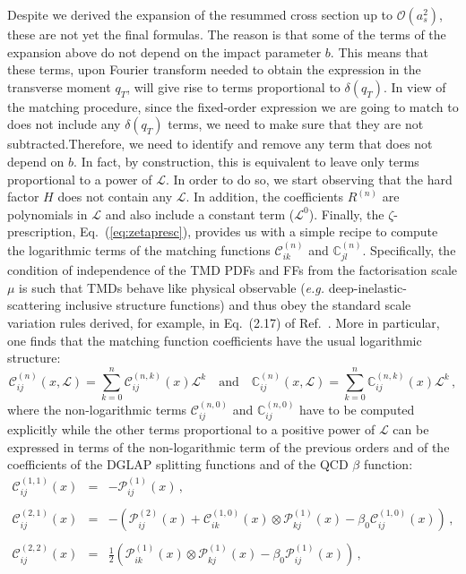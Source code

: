 \documentclass[10pt,a4paper]{article}
\begin{document}
Despite we derived the expansion of the resummed cross section up to
$\mathcal{O}(a_s^2)$, these are not yet the final formulas. The reason
is that some of the terms of the expansion above do not depend on the
impact parameter $b$. This means that these terms, upon Fourier
transform needed to obtain the expression in the transverse moment
$q_T$, will give rise to terms proportional to $\delta(q_T)$. In view
of the matching procedure, since the fixed-order expression we are
going to match to does not include any $\delta(q_T)$ terms, we need to
make sure that they are not subtracted.Therefore, we need to identify
and remove any term that does not depend on $b$. In fact, by
construction, this is equivalent to leave only terms proportional to a
power of $\mathcal{L}$. In order to do so, we start observing that the
hard factor $H$ does not contain any $\mathcal{L}$. In addition, the
coefficients $R^{(n)}$ are polynomials in $\mathcal{L}$ and also
include a constant term ($\mathcal{L}^0$). Finally, the
$\zeta$-prescription, Eq.~(\ref{eq:zetapresc}), provides us with a
simple recipe to compute the logarithmic terms of the matching
functions $\mathcal{C}_{ik}^{(n)}$ and
$\mathbb{C}_{jl}^{(n)}$. Specifically, the condition of independence
of the TMD PDFs and FFs from the factorisation scale $\mu$ is such
that TMDs behave like physical observable (\textit{e.g.}
deep-inelastic-scattering inclusive structure functions) and thus obey
the standard scale variation rules derived, for example, in Eq.~(2.17)
of Ref.~\cite{vanNeerven:2000uj}. More in particular, one finds that
the matching function coefficients have the usual logarithmic
structure:
\begin{equation}
\mathcal{C}_{ij}^{(n)}(x,\mathcal{L}) =
\sum_{k=0}^{n}\mathcal{C}_{ij}^{(n,k)}(x)\mathcal{L}^k\quad\mbox{and}\quad \mathbb{C}_{ij}^{(n)}(x,\mathcal{L}) = \sum_{k=0}^{n}\mathbb{C}_{ij}^{(n,k)}(x)\mathcal{L}^k \,,
\end{equation}
where the non-logarithmic terms $\mathcal{C}_{ij}^{(n,0)}$ and
$\mathbb{C}_{ij}^{(n,0)}$ have to be computed explicitly while the
other terms proportional to a positive power of $\mathcal{L}$ can be
expressed in terms of the non-logarithmic term of the previous orders
and of the coefficients of the DGLAP splitting functions and of the
QCD $\beta$ function:
\begin{equation}
\begin{array}{rcl}
  \mathcal{C}_{ij}^{(1,1)}(x) &=& -\mathcal{P}_{ij}^{(1)}(x) \,,\\
  \\
  \mathcal{C}_{ij}^{(2,1)}(x) &=& -\left(\mathcal{P}_{ij}^{(2)}(x)+\mathcal{C}_{ik}^{(1,0)}(x)
                                  \otimes
                                  \mathcal{P}_{kj}^{(1)}(x)-\beta_0
                                  \mathcal{C}_{ij}^{(1,0)}(x) \right)\,,\\
  \\
  \mathcal{C}_{ij}^{(2,2)}(x) &=&\displaystyle
                                  \frac12\left(\mathcal{P}_{ik}^{(1)}(x)\otimes \mathcal{P}_{kj}^{(1)}(x)-\beta_0 \mathcal{P}_{ij}^{(1)}(x)\right)\,,\\
\end{array}
\end{equation}
\end{document}
